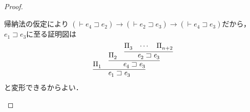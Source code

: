\documentclass{ltjsbook}%
\begin{document}
\begin{proof}
\begin{itemize}
    帰納法の仮定により%
    $(\vdash\mathit{e}_4^{}\sqsupset\mathit{e}_2^{})\rightarrow%
    (\vdash\mathit{e}_2^{}\sqsupset\mathit{e}_3^{})\rightarrow%
    (\vdash\mathit{e}_4^{}\sqsupset\mathit{e}_3^{})$だから，%
    $\mathit{e}_1^{}\sqsupset\mathit{e}_3^{}$に至る証明図は%
    \begin{equation}%
      \infer{%
        \mathit{e}_1^{}\sqsupset\mathit{e}_3^{}%
      }{%
        \Pi_1^{}%
      &%
        \infer{%
          \mathit{e}_4^{}\sqsupset\mathit{e}_3^{}%
        }{%
          \Pi_2^{}%
        &%
          \infer{%
            \mathit{e}_2^{}\sqsupset\mathit{e}_3^{}%
          }{%
            \Pi_3^{}&\cdots&\Pi_{n+2}^{}%
          }%
        }%
      }%
    \end{equation}%
    と変形できるからよい．%
  \end{itemize}%
\end{proof}%
\end{document}
